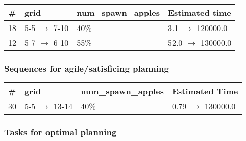 \documentclass{article}
\begin{document}
                            \begin{center}
                            \begin{tabular}{@{}l|l|l|l@{}}
                            \# & grid & num\_spawn\_apples & Estimated time\\\midrule
                            18&5-5 $\rightarrow$ 7-10&40\%&3.1 $\rightarrow$ 120000.0\\
12&5-7 $\rightarrow$ 6-10&55\%&52.0 $\rightarrow$ 130000.0
                            \end{tabular}
                            \end{center}
                    
                         \subsubsection*{Sequences for agile/satisficing planning}

                        \begin{center}
                        \begin{tabular}{@{}l|l|l|l@{}}
                        \# & grid & num\_spawn\_apples & Estimated Time\\\midrule
                        30&5-5 $\rightarrow$ 13-14&40\%&0.79 $\rightarrow$ 130000.0
                        \end{tabular}
                        \end{center}
                    
                                \subsubsection*{Tasks for optimal planning}
                                
\end{document}
